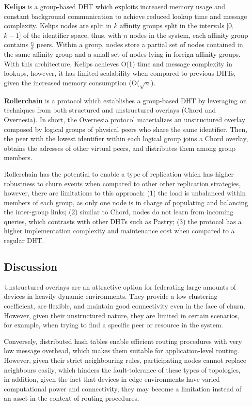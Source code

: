 \textbf{Kelips} \cite{gupta2003kelips} is a group-based DHT which exploits increased memory usage and constant background communication to achieve reduced lookup time and message complexity. Kelips nodes are split in $k$ affinity groups split in the intervals [0,$k-1$] of the identifier space, thus, with $n$ nodes in the system, each affinity group contains $\frac{n}{k}$ peers. Within a group, nodes store a partial set of nodes contained in the same affinity group and a small set of nodes lying in foreign affinity groups. With this architecture, Kelips achieves O(1) time and message complexity in lookups, however, it has limited scalability when compared to previous DHTs, given the increased memory consumption (O($\sqrt{n}$).

\textbf{Rollerchain} \cite{rollerchain} is a protocol which establishes a group-based DHT by leveraging on techniques from both structured and unstructured  overlays (Chord and Overnesia). In short, the Overnesia protocol materializes an unstructured overlay composed by logical groups of physical peers who share the same identifier. Then, the peer with the lowest identifier within each logical group joins a Chord overlay, obtains the adresses of other virtual peers, and distributes them among group members.

Rollerchain has the potential to enable a type of replication which has higher robustness to churn events when compared to other other replication strategies, however, there are limitations to this approach: (1) the load is unbalanced within members of each group, as only one node is in charge of populating and balancing the inter-group links; (2) similar to Chord, nodes do not learn from incoming queries, which contrasts with other DHTs such as Pastry; (3) the protocol has a higher implementation complexity and maintenance cost when compared to a regular DHT.

\subsection{Discussion}

Unstructured overlays are an attractive option for federating large amounts of devices in heavily dynamic environments. They provide a low clustering coefficient, are flexible, and maintain good connectivity even in the face of churn. However, given their unstructured nature, they are limited in certain scenarios, for example, when trying to find a specific peer or resource in the system.

Conversely, distributed hash tables enable efficient routing procedures with very low message overhead, which makes them suitable for application-level routing. However, given their strict neighbouring rules, participating nodes cannot replace neighbours easily, which hinders the fault-tolerance of these types of topologies, in addition, given the fact that devices in edge environments have varied computational power and connectivity, they may become a limitation instead of an asset in the context of routing procedures. 

